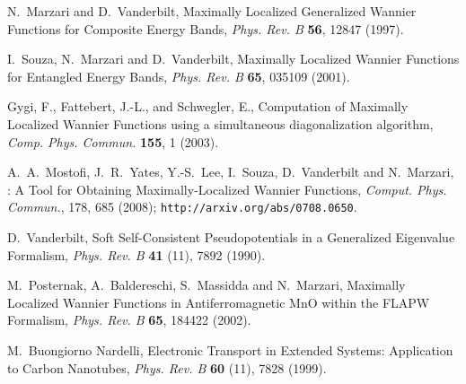 \documentclass[a4paper,11pt,twoside]{book}
\begin{document}
\begin{thebibliography}{99}


 N.~Marzari and D.~Vanderbilt, 
  Maximally Localized Generalized Wannier Functions for Composite
  Energy Bands, {\it Phys. Rev. B} {\bf 56}, 12847 (1997).  

 I.~Souza, N.~Marzari and D.~Vanderbilt, Maximally
     Localized Wannier Functions for Entangled Energy Bands, {\it
     Phys. Rev. B} {\bf 65}, 035109 (2001).

 Gygi, F., Fattebert, J.-L., and Schwegler, E.,
 Computation of Maximally Localized Wannier Functions using a
 simultaneous diagonalization algorithm, {\it Comp. Phys. Commun.}
 {\bf 155}, 1 (2003).

 A.~A.~Mostofi, J.~R.~Yates, Y.-S.~Lee, I.~Souza,
   D.~Vanderbilt and N.~Marzari, \wannier: A Tool for Obtaining
   Maximally-Localized Wannier Functions, {\it Comput. Phys. Commun.},
   178, 685 (2008); {\tt http://arxiv.org/abs/0708.0650}.

 D.~Vanderbilt, Soft Self-Consistent Pseudopotentials in
  a Generalized Eigenvalue Formalism, {\it Phys. Rev. B} {\bf 41}
  (11), 7892 (1990).

 M.~Posternak, A.~Baldereschi, S.~Massidda and
  N.~Marzari, Maximally Localized Wannier Functions in
  Antiferromagnetic MnO within the FLAPW Formalism, {\it Phys. Rev. B}
  {\bf 65}, 184422 (2002).

 M.~Buongiorno Nardelli, Electronic Transport in Extended Systems:
  Application to Carbon Nanotubes, {\it Phys. Rev. B} {\bf 60}
  (11), 7828 (1999).




\end{thebibliography}
\end{document}
